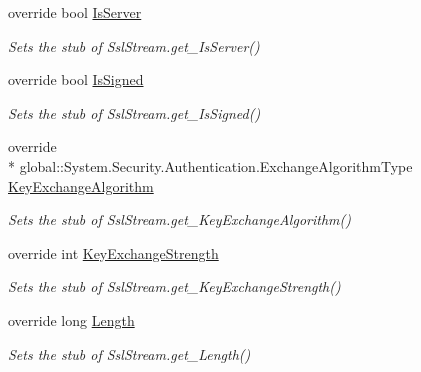 \begin{DoxyCompactItemize}
override bool \hyperlink{class_system_1_1_net_1_1_security_1_1_fakes_1_1_stub_ssl_stream_ad21639340d19961d59a8f111a4b32213}{Is\-Server}
\begin{DoxyCompactList}\small\item\em Sets the stub of Ssl\-Stream.\-get\-\_\-\-Is\-Server()\end{DoxyCompactList}\item 
override bool \hyperlink{class_system_1_1_net_1_1_security_1_1_fakes_1_1_stub_ssl_stream_a886bd1e3b51214929db78425b05ed32c}{Is\-Signed}
\begin{DoxyCompactList}\small\item\em Sets the stub of Ssl\-Stream.\-get\-\_\-\-Is\-Signed()\end{DoxyCompactList}\item 
override \\*
global\-::\-System.\-Security.\-Authentication.\-Exchange\-Algorithm\-Type \hyperlink{class_system_1_1_net_1_1_security_1_1_fakes_1_1_stub_ssl_stream_a100c0caf59537d45324b01a17585eeb0}{Key\-Exchange\-Algorithm}
\begin{DoxyCompactList}\small\item\em Sets the stub of Ssl\-Stream.\-get\-\_\-\-Key\-Exchange\-Algorithm()\end{DoxyCompactList}\item 
override int \hyperlink{class_system_1_1_net_1_1_security_1_1_fakes_1_1_stub_ssl_stream_ae82c3cef1dbd22aaae1ce461266e8757}{Key\-Exchange\-Strength}
\begin{DoxyCompactList}\small\item\em Sets the stub of Ssl\-Stream.\-get\-\_\-\-Key\-Exchange\-Strength()\end{DoxyCompactList}\item 
override long \hyperlink{class_system_1_1_net_1_1_security_1_1_fakes_1_1_stub_ssl_stream_ad543683d6aaef8fc329663b075f16e9c}{Length}
\begin{DoxyCompactList}\small\item\em Sets the stub of Ssl\-Stream.\-get\-\_\-\-Length()\end{DoxyCompactList}\item 

\end{DoxyCompactItemize}
